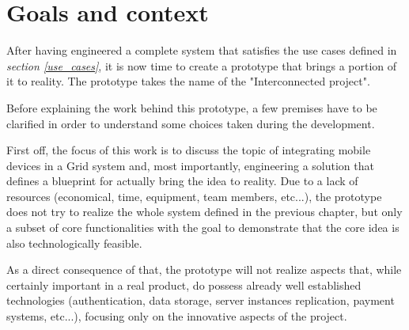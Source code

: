 \section{Goals and context}
After having engineered a complete system that satisfies the use cases defined in \textit{section \ref{use_cases}}, it is now time to create a prototype that brings a portion of it to reality. The prototype takes the name of the "Interconnected project".

Before explaining the work behind this prototype, a few premises have to be clarified in order to understand some choices taken during the development.

First off, the focus of this work is to discuss the topic of integrating mobile devices in a Grid system and, most importantly, engineering a solution that defines a blueprint for actually bring the idea to reality. Due to a lack of resources (economical, time, equipment, team members, etc...), the prototype does not try to realize the whole system defined in the previous chapter, but only a subset of core functionalities with the goal to demonstrate that the core idea is also technologically feasible.

As a direct consequence of that, the prototype will not realize aspects that, while certainly important in a real product, do possess already well established technologies (authentication, data storage, server instances replication, payment systems, etc...), focusing only on the innovative aspects of the project.
